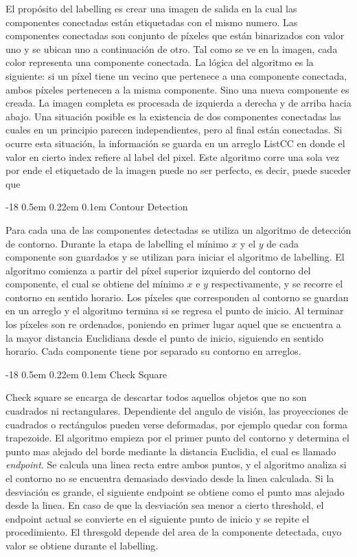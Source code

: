 \documentclass[runningheads]{llncs}
\makeatletter
\renewcommand\subsubsection{\@startsection{subsubsection}{3}{\z@}%
	{-18\p@ \@plus -4\p@ \@minus -4\p@}%
	{0.5em \@plus 0.22em \@minus 0.1em}%
	{\normalfont\normalsize\bfseries\boldmath}}
\makeatother
\begin{document}
El propósito del labelling es crear una imagen de salida en la cual las componentes conectadas 
están etiquetadas con el mismo numero. Las componentes conectadas son conjunto de píxeles que 
están binarizados con valor uno y se ubican uno a continuación de otro. Tal como se ve en la imagen, 
cada color representa una componente conectada.
La lógica del algoritmo es la siguiente: si un píxel tiene un vecino que pertenece a una componente 
conectada, ambos píxeles pertenecen a la misma componente. Sino una nueva componente es creada. La 
imagen completa es procesada de izquierda a derecha y de arriba hacia abajo. Una situación posible 
es la existencia de dos componentes conectadas las cuales en un principio parecen independientes, 
pero al final están conectadas. Si ocurre esta situación, la información se guarda en un arreglo ListCC 
en donde el valor en cierto index refiere al label del pixel. Este algoritmo corre una sola vez por ende 
el etiquetado de la imagen puede no ser perfecto, es decir, puede suceder que  

\subsubsection{Contour Detection}

Para cada una de las componentes detectadas se utiliza un algoritmo de detección de contorno. Durante la 
etapa de labelling el mínimo $x$ y el $y$ de cada componente son guardados y se utilizan para iniciar 
el algoritmo de labelling. El algoritmo comienza a partir del píxel superior izquierdo del contorno del componente, el cual se obtiene del mínimo $x$ e $y$ respectivamente, y se recorre el contorno en sentido horario. Los píxeles que corresponden al contorno se guardan en un arreglo 
y el algoritmo termina si se regresa el punto de inicio. Al terminar los píxeles son re ordenados, poniendo en primer 
lugar aquel que se encuentra a la mayor distancia Euclidiana desde el punto de inicio, siguiendo en sentido 
horario. Cada componente tiene por separado su contorno en arreglos. \cite{report}

\subsubsection{Check Square}	

Check square se encarga de descartar todos aquellos objetos que no son cuadrados ni rectangulares. Dependiente del angulo de visión, las proyecciones de cuadrados o rectángulos pueden verse deformadas, por ejemplo quedar con forma trapezoide. El algoritmo empieza por el primer punto del contorno y determina el punto mas alejado del borde mediante la distancia Euclidia, el cual es llamado \textit{endpoint}. Se calcula una linea recta entre ambos puntos, y el algoritmo analiza si el contorno no se encuentra demasiado desviado desde la linea calculada. Si la desviación es grande, el siguiente endpoint se obtiene como el punto mas alejado desde la linea. En caso de que la desviación sea menor a cierto threshold, el endpoint actual se convierte en el siguiente punto de inicio y se repite el procedimiento. El thresgold depende del area de la componente detectada, cuyo valor se obtiene durante el labelling.
\end{document}
